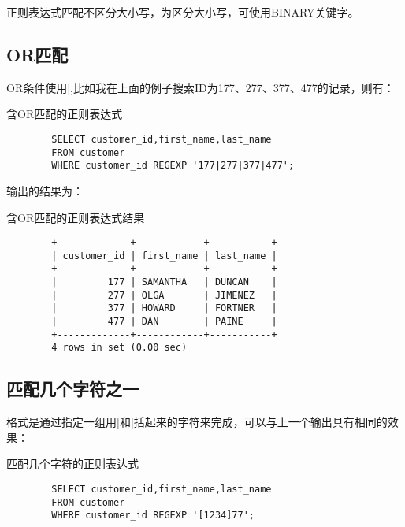 \documentclass[UTF8]{article}
\begin{document}
\begin{orangebox}[frametitle={Tips 9.1.2 匹配不区分大小写 }]
        正则表达式匹配不区分大小写，为区分大小写，可使用BINARY关键字。
\end{orangebox}

\subsection{OR匹配}

OR条件使用|,比如我在上面的例子搜索ID为177、277、377、477的记录，则有：

\begin{listing}[H]
	\caption{含OR匹配的正则表达式}
	\label{code:ormatchzhengze}
\begin{verbatim}
        SELECT customer_id,first_name,last_name 
        FROM customer 
        WHERE customer_id REGEXP '177|277|377|477';
\end{verbatim}
\end{listing}

输出的结果为：

\begin{listing}[H]
	\caption{含OR匹配的正则表达式结果}
	\label{code:ormatchzhengzeresult}
\begin{verbatim}
        +-------------+------------+-----------+
        | customer_id | first_name | last_name |
        +-------------+------------+-----------+
        |         177 | SAMANTHA   | DUNCAN    |
        |         277 | OLGA       | JIMENEZ   |
        |         377 | HOWARD     | FORTNER   |
        |         477 | DAN        | PAINE     |
        +-------------+------------+-----------+
        4 rows in set (0.00 sec)
\end{verbatim}
\end{listing}

\subsection{匹配几个字符之一}
格式是通过指定一组用[和]括起来的字符来完成，可以与上一个输出具有相同的效果：

\begin{listing}[H]
	\caption{匹配几个字符的正则表达式}
	\label{code:mulmatchzhengze}
\begin{verbatim}
        SELECT customer_id,first_name,last_name 
        FROM customer 
        WHERE customer_id REGEXP '[1234]77';
\end{verbatim}
\end{listing}
\end{document}
